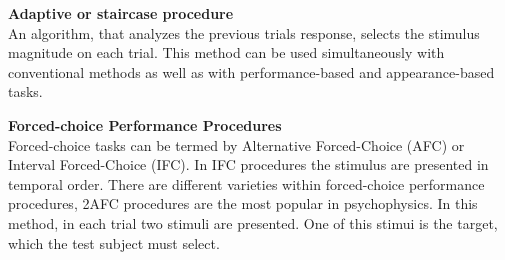 \textbf{Adaptive or staircase procedure}
\\
An algorithm, that analyzes the previous trials response, selects the stimulus magnitude on each trial. This method can be used simultaneously  with conventional methods as well as with performance-based and appearance-based tasks.

\textbf{Forced-choice Performance Procedures}
\\
Forced-choice tasks can be termed by Alternative Forced-Choice (AFC) or Interval Forced-Choice (IFC). In IFC procedures the stimulus are presented in temporal order. There are different varieties within forced-choice performance procedures, 2AFC procedures are the most popular in psychophysics. In this method, in each trial two stimuli are presented. One of this stimui is the target, which the test subject must select.
